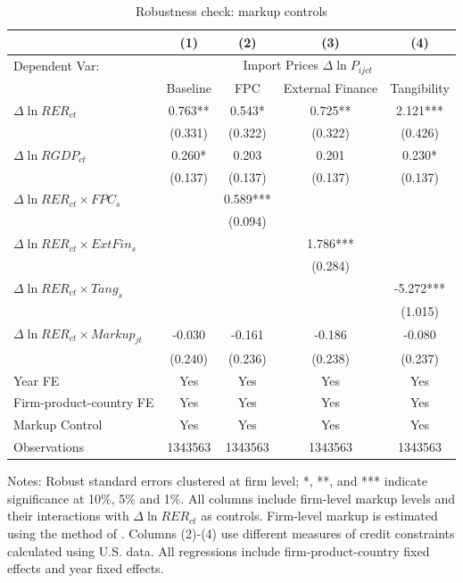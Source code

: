 \begin{table}[htbp]
	\centering
	\caption{Robustness check: markup controls}
	\begin{threeparttable}
		\begin{tabular}{lcccc}
			\toprule         
			& (1)   & (2)   & (3)   & (4)     \\
			\midrule
                Dependent Var: & \multicolumn{4}{c}{ Import Prices $\Delta \ln P_{ijct}$} \\
			& Baseline & FPC & External Finance & Tangibility\\
			\midrule
			$\Delta \ln RER_{ct}$ & 0.763** & 0.543* & 0.725** & 2.121*** \\
			& (0.331) & (0.322) & (0.322) & (0.426) \\
			$\Delta \ln RGDP_{ct}$ & 0.260*	& 0.203 & 0.201 & 0.230*\\
			& (0.137) & (0.137) & (0.137) & (0.137)  \\
			$\Delta \ln RER_{ct} \times FPC_{s}$ &   & 0.589*** &       &  \\
			&   & (0.094) &       &  \\
			$\Delta \ln RER_{ct} \times ExtFin_{s}$ &     &       & 1.786*** &  \\
			&   &       & (0.284) &  \\
			$\Delta \ln RER_{ct} \times Tang_{s}$  &     &       &       & -5.272*** \\
			&    &       &       & (1.015) \\
                $\Delta \ln RER_{ct} \times Markup_{jt}$ &  -0.030 & -0.161 & -0.186 & -0.080 \\
			&   (0.240) & (0.236) & (0.238) & (0.237) \\
                \midrule
			Year FE  & Yes   & Yes   & Yes   & Yes       \\
			Firm-product-country FE & Yes   & Yes   & Yes   & Yes       \\
			Markup Control & Yes   & Yes   & Yes   & Yes       \\
			Observations & 1343563 & 1343563 & 1343563 & 1343563  \\
			\bottomrule
		\end{tabular}
		\begin{tablenotes}
			\footnotesize
			\item Notes: Robust standard errors clustered at firm level; *, **, and *** indicate significance at 10\%, 5\% and 1\%. All columns include firm-level markup levels and their interactions with $\Delta \ln RER_{ct}$ as controls. Firm-level markup is estimated using the method of \cite{dlw2012}. Columns (2)-(4) use different measures of credit constraints calculated using U.S. data. All regressions include firm-product-country fixed effects and year fixed effects.
		\end{tablenotes}
	\end{threeparttable}
        \label{tab.markup}
\end{table}

